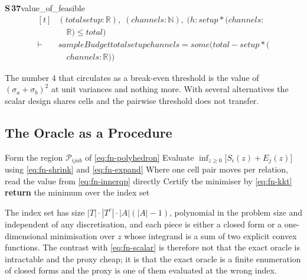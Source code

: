 \documentclass[conference]{IEEEtran}
\theoremstyle{definition}
\newcommand{\lean}[1]{\textsf{\footnotesize #1}}
\begin{document}
\noindent\textbf{S\,37}\quad\lean{value\_of\_feasible}
{\footnotesize\[ \begin{aligned}[t]
&(\mathit{total} \mathit{setup} : \mathbb{R} ),\; (\mathit{channels} : \mathbb{N} ),\; (\mathit{h} : \mathit{setup} * (\mathit{channels} :\\
&\quad \mathbb{R} ) \leq \mathit{total})\\
\vdash\;&\mathit{sampleBudget} \mathit{total} \mathit{setup} \mathit{channels} = \mathit{some} (\mathit{total} - \mathit{setup} * (\\
&\quad \mathit{channels} : \mathbb{R} ))
\end{aligned} \]}


The number $4$ that circulates as a break-even threshold is the value of
$(\sigma_{a}+\sigma_{b})^{2}$ at unit variances and nothing more. With several alternatives
the scalar design shares cells and the pairwise threshold does not transfer.

\subsection{The Oracle as a Procedure}
\label{sec:fn-procedure}

\begin{algorithm}[htbp]
\caption{Exact certification energy}
\label{alg:fn-oracle}
\begin{algorithmic}[1]
  \STATE Form the region $\mathcal{P}_{ijab}$ of \eqref{eq:fn-polyhedron}
  \STATE Evaluate $\inf_{z\ge0}\bigl[S_{i}(z)+E_{j}(z)\bigr]$ using
         \eqref{eq:fn-shrink} and \eqref{eq:fn-expand}
  \STATE Where one cell pair moves per relation, read the value from
         \eqref{eq:fn-innerqp} directly
  \STATE Certify the minimiser by \eqref{eq:fn-kkt} 
\ENDFOR
\STATE \textbf{return} the minimum over the index set
\end{algorithmic}
\end{algorithm}

The index set has size $|T|\cdot|T^{c}|\cdot|A|(|A|-1)$, polynomial in the problem size and
independent of any discretisation, and each piece is either a closed form or a
one-dimensional minimisation over $z$ whose integrand is a sum of two explicit convex
functions. The contrast with \eqref{eq:fn-scalar} is therefore not that the exact oracle is
intractable and the proxy cheap; it is that the exact oracle is a finite enumeration of
closed forms and the proxy is one of them evaluated at the wrong index.
\end{document}
